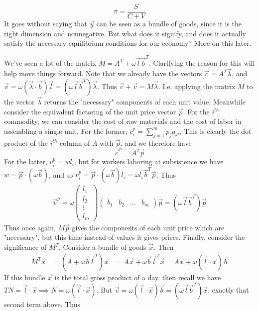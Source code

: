 \[ \pi = \frac{S}{C+V} \]
It goes without saying that $\vec{y}$ can be seen as a bundle of goods, since it is the right dimension and nonnegative. But what does it signify, and does it actually satisfy the necessary equilibrium conditions for our economy? More on this later. \par 
We've seen a lot of the matrix $M = A^T + \omega\vec{l}\vec{b}^T$. Clarifying the reason for this will help move things forward. Note that we already have the vectors $\vec{c} = A^T\vec{\lambda}$, and $\vec{v} = \omega(\vec{\lambda} \cdot \vec{b})\vec{l} = (\omega\vec{l}\vec{b}^T)\vec{\lambda}$. Thus $\vec{c} + \vec{v} = M\vec{\lambda}$. I.e. applying the matrix $M$ to the vector $\vec{\lambda}$ returns the "necessary" components of each unit value. Meanwhile consider the equivalent factoring of the unit price vector $\vec{p}$. For the $i^{th}$ commodity, we can consider the cost of raw materials and the cost of labor in assembling a single unit. For the former, $c^p_i = \sum_{j=1}^m p_ja_{ji}$. This is clearly the dot product of the $i^{th}$ column of $A$ with $\vec{p}$, and we therefore have 
\[ \vec{c}^p = A^T\vec{p} \] 
For the latter, $v^p_i = wl_i$, but for workers laboring at subsistence we have $w = \vec{p}\cdot (\omega\vec{b})$, and so $v^p_i = \vec{p}\cdot (\omega\vec{b})l_i = \omega l_i \vec{b}^T\vec{p}$. Thus 
\begin{align*}
	\vec{v}^p = \omega\begin{pmatrix} l_1 \\ l_2 \\ \vdots \\ l_m \end{pmatrix} \begin{pmatrix} b_1 & b_2 & \ldots & b_m \end{pmatrix}\vec{p} = (\omega\vec{l}\vec{b}^T)\vec{p}
\end{align*}
Thus once again, $M\vec{p}$ gives the components of each unit price which are "necessary", but this time instead of values it gives prices. Finally, consider the significance of $M^T$. Consider a bundle of goods $\vec{x}$. Then
\begin{align*}
	 M^T\vec{x} &= (A + \omega\vec{b}\vec{l}^T)\vec{x}
	 	&= A\vec{x} + \omega\vec{b}\vec{l}^T\vec{x} = A\vec{x} + \omega(\vec{l}\cdot \vec{x})\vec{b}
\end{align*} 
If this bundle $\vec{x}$ is the total gross product of a day, then recall we have $T\bar{N} = \vec{l}\cdot\vec{x} \implies  \bar{N} = \omega(\vec{l}\cdot\vec{x})$. But $\vec{v} = \omega(\vec{l}\cdot\vec{x})\vec{b} = (\omega\vec{l}\vec{b}^T)\vec{x}$, exactly that second term above. Thus 
